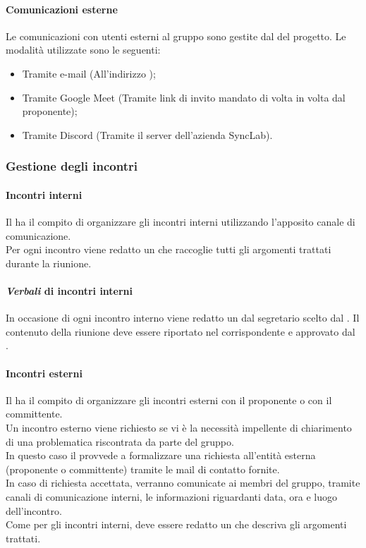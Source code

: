 \paragraph{Comunicazioni esterne}
Le comunicazioni con utenti esterni al gruppo sono gestite dal \roleProjectManagerLow{} del progetto. Le modalità utilizzate sono le seguenti:
\begin {itemize}
\item Tramite e-mail (All'indirizzo \groupEmail{});
\item Tramite Google Meet\glo{} (Tramite link di invito mandato di volta in volta dal proponente);
\item Tramite Discord\glo{} (Tramite il server dell'azienda SyncLab).
\end {itemize}

\subsubsection{Gestione degli incontri}
\paragraph{Incontri interni}
Il \roleProjectManagerLow{} ha il compito di organizzare gli incontri interni utilizzando l'apposito canale di comunicazione.\\
Per ogni incontro viene redatto un \docNameVLow{} che raccoglie tutti gli argomenti trattati durante la riunione.
\paragraph {\textit{Verbali} di incontri interni}
In occasione di ogni incontro interno viene redatto un \docNameVLow{} dal segretario scelto dal \roleProjectManagerLow{}. Il contenuto della riunione deve essere riportato nel \docNameVLow{} corrispondente e approvato dal \roleProjectManagerLow{}.

\paragraph{Incontri esterni}
Il \roleProjectManagerLow{} ha il compito di organizzare gli incontri esterni con il proponente o con il committente.\\
Un incontro esterno viene richiesto se vi è la necessità impellente di chiarimento di una problematica riscontrata da parte del gruppo.\\
In questo caso il \roleProjectManagerLow{} provvede a formalizzare una richiesta all'entità esterna (proponente o committente) tramite le mail di contatto fornite.\\
In caso di richiesta accettata, verranno comunicate ai membri del gruppo, tramite canali di comunicazione interni, le informazioni riguardanti data, ora e luogo dell'incontro.\\
Come per gli incontri interni, deve essere redatto un \docNameVLow{} che descriva gli argomenti trattati.
